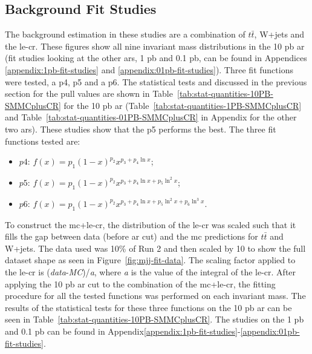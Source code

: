 \subsection{Background Fit Studies}\label{sec:bkg-fit-studies}

The background estimation in these studies are a combination of $t\bar{t}$, W+jets and the \gls{le-cr}. These 
figures show all nine invariant mass distributions in the 10 pb \gls{ar} (fit studies looking at the other \gls{ar}s, 1 pb and 0.1 pb, can be found in Appendices \ref{appendix:1pb-fit-studies} and \ref{appendix:01pb-fit-studies}).
Three fit functions were tested, a p4, p5 and a p6. The statistical tests and discussed in the previous section for the pull values are shown in Table~\ref{tab:stat-quantities-10PB-SMMCplusCR} for the 10 pb \gls{ar}
(Table~\ref{tab:stat-quantities-1PB-SMMCplusCR} and Table~\ref{tab:stat-quantities-01PB-SMMCplusCR} in Appendix for the other two \gls{ar}s). These studies show that the p5 performs the best. The three fit functions tested are:

\begin{itemize}
    \item $p4$: $f(x) = p_1 (1 - x)^{p_2} x^{p_3 + p_4\ln x}$;
    \item $p5$: $f(x) = p_1 (1 - x)^{p_2} x^{p_3 + p_4\ln x + p_5 \ln^2 x}$;
    \item $p6$: $f(x) = p_1 (1 - x)^{p_2} x^{p_3 + p_4\ln x + p_5 \ln^2 x + p_6 \ln^3 x}$.
\end{itemize}

To construct the \gls{mc}+\gls{le-cr}, the distribution of the \gls{le-cr} was scaled such that it fills the gap between data (before \gls{ar} cut) and the \gls{mc} 
predictions for $t\bar{t}$ and W+jets. The data used was 10\% of Run 2 and then scaled by 10 to show the full dataset shape as seen in Figure~\ref{fig:mjj-fit-data}. The scaling factor applied to the 
\gls{le-cr} is (\textit{data}-\textit{MC})/\textit{a}, where \textit{a} is the value of the integral of the \gls{le-cr}. After applying the 10 pb \gls{ar} cut to 
the combination of the \gls{mc}+\gls{le-cr}, the fitting procedure for all the tested functions was performed on each invariant mass. The results of the 
statistical tests for these three functions on the 10 pb \gls{ar} can be seen in Table~\ref{tab:stat-quantities-10PB-SMMCplusCR}. The studies on the 1 pb and 0.1 pb can be found in Appendix\ref{appendix:1pb-fit-studies}-\ref{appendix:01pb-fit-studies}. 

